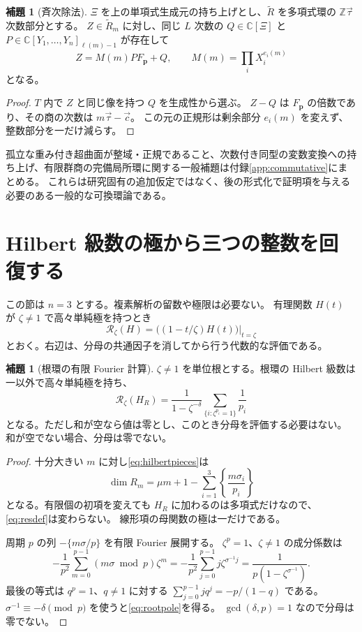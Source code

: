 \documentclass[11pt,a4paper]{ltjsarticle}
\numberwithin{equation}{section}
\theoremstyle{definition}
\newtheorem{lemma}[theorem]{補題}
\newcommand{\Z}{\mathbb Z}\newcommand{\N}{\mathbb N}\newcommand{\Q}{\mathbb Q}\newcommand{\C}{\mathbb C}
\newcommand{\cc}{\vec c}\newcommand{\xx}{\vec x}\newcommand{\om}{\vec\omega}\newcommand{\ta}{\vec\tau}
\newcommand{\bp}{\mathbf p}\newcommand{\bw}{\mathbf w}\newcommand{\one}{\mathbf 1}
\newcommand{\Res}{\mathcal R}\newcommand{\Sig}{\mathcal A}\newcommand{\mf}{\mathfrak m}
\begin{document}
\begin{lemma}[斉次除法]\label{lem:division}
$\Xi$ を上の単項式生成元の持ち上げとし、$\widetilde R$ を多項式環の $\Z\ta$ 次数部分とする。
$Z\in\widetilde R_m$ に対し、同じ $L$ 次数の $Q\in\C[\Xi]$ と
$P\in\C[Y_1,\dots,Y_n]_{\ell(m)-1}$ が存在して
\begin{equation}\label{eq:division}
 Z=M(m)PF_{\bp}+Q,\qquad M(m)=\prod_iX_i^{e_i(m)}
\end{equation}
となる。
\end{lemma}
\begin{proof}
$T$ 内で $Z$ と同じ像を持つ $Q$ を生成性から選ぶ。
$Z-Q$ は $F_{\bp}$ の倍数であり、その商の次数は $m\ta-\cc$。
この元の正規形は剰余部分 $e_i(m)$ を変えず、整数部分を一だけ減らす。
\end{proof}

孤立な重み付き超曲面が整域・正規であること、次数付き同型の変数変換への持ち上げ、有限群商の完備局所環に関する一般補題は付録\ref{app:commutative}にまとめる。
これらは研究固有の追加仮定ではなく、後の形式化で証明項を与える必要のある一般的な可換環論である。

\section{Hilbert 級数の極から三つの整数を回復する}\label{sec:poles}
この節は $n=3$ とする。複素解析の留数や極限は必要ない。
有理関数 $H(t)$ が $\zeta\ne1$ で高々単純極を持つとき
\begin{equation}\label{eq:resdef}
 \Res_\zeta(H)=\left.\bigl((1-t/\zeta)H(t)\bigr)\right|_{t=\zeta}
\end{equation}
とおく。右辺は、分母の共通因子を消してから行う代数的な評価である。

\begin{lemma}[根環の有限 Fourier 計算]\label{lem:rootpole}
$\zeta\ne1$ を単位根とする。根環の Hilbert 級数は一以外で高々単純極を持ち、
\begin{equation}\label{eq:rootpole}
 \Res_\zeta(H_R)=
 \frac{1}{1-\zeta^{-\delta}}
 \sum_{\{i:\zeta^{p_i}=1\}}\frac1{p_i}
\end{equation}
となる。ただし和が空なら値は零とし、このとき分母を評価する必要はない。
和が空でない場合、分母は零でない。
\end{lemma}
\begin{proof}
十分大きい $m$ に対し\eqref{eq:hilbertpieces}は
\[
 \dim R_m=\mu m+1-\sum_{i=1}^3\left\{\frac{m\sigma_i}{p_i}\right\}
\]
となる。有限個の初項を変えても $H_R$ に加わるのは多項式だけなので、\eqref{eq:resdef}は変わらない。
線形項の母関数の極は一だけである。

周期 $p$ の列 $-\{m\sigma/p\}$ を有限 Fourier 展開する。
$\zeta^p=1$、$\zeta\ne1$ の成分係数は
\[
 -\frac1{p^2}\sum_{m=0}^{p-1}(m\sigma\bmod p)\zeta^m
 =-\frac1{p^2}\sum_{j=0}^{p-1}j\zeta^{\sigma^{-1}j}
 =\frac1{p(1-\zeta^{\sigma^{-1}})}.
\]
最後の等式は $q^p=1$、$q\ne1$ に対する
$\sum_{j=0}^{p-1}j q^j=-p/(1-q)$ である。
$\sigma^{-1}\equiv-\delta\pmod p$ を使うと\eqref{eq:rootpole}を得る。
$\gcd(\delta,p)=1$ なので分母は零でない。
\end{proof}
\end{document}
